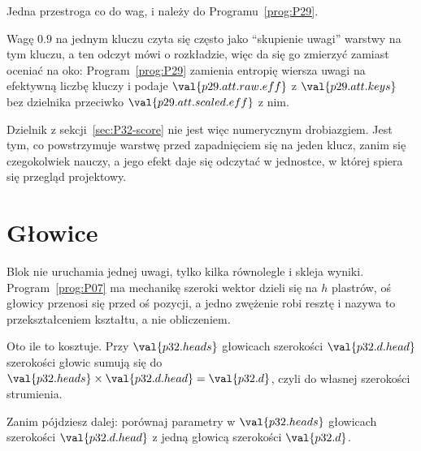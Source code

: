 \begin{fr}
Jedna przestroga co do wag, i należy do Programu~\ref{prog:P29}.

Wagę $\num{0.9}$ na jednym kluczu czyta się często jako
\enquote{skupienie uwagi} warstwy na tym kluczu, a ten odczyt mówi o
rozkładzie, więc da się go zmierzyć zamiast oceniać na oko:
Program~\ref{prog:P29} zamienia entropię wiersza uwagi na efektywną liczbę
kluczy i podaje $\val{p29.att.raw.eff}$ z $\val{p29.att.keys}$ bez dzielnika
przeciwko $\val{p29.att.scaled.eff}$ z nim.

Dzielnik z sekcji~\ref{sec:P32-score} nie jest więc numerycznym drobiazgiem.
Jest tym, co powstrzymuje warstwę przed zapadnięciem się na jeden klucz,
zanim się czegokolwiek nauczy, a jego efekt daje się odczytać w jednostce, w
której spiera się przegląd projektowy.
\end{fr}

\section{Głowice}
\label{sec:P32-heads}

\begin{fr}
Blok nie uruchamia jednej uwagi, tylko kilka równolegle i skleja wyniki.
Program~\ref{prog:P07} ma mechanikę \dash{} szeroki wektor dzieli się na $h$
plastrów, oś głowicy przenosi się przed oś pozycji, a jedno zwężenie robi
resztę \dash{} i nazywa to przekształceniem kształtu, a nie obliczeniem.

Oto ile to kosztuje. Przy $\val{p32.heads}$ głowicach szerokości
$\val{p32.d.head}$ szerokości głowic sumują się do
$\val{p32.heads} \times \val{p32.d.head} = \val{p32.d}$, czyli do własnej
szerokości strumienia.

Zanim pójdziesz dalej: porównaj parametry w $\val{p32.heads}$ głowicach
szerokości $\val{p32.d.head}$ z jedną głowicą szerokości $\val{p32.d}$.
\dotline
\nextframe
\end{fr}

